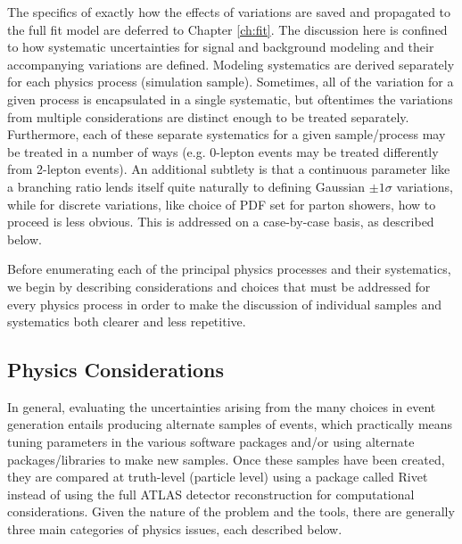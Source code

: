 The specifics of exactly how the effects of variations are saved and propagated to the full fit model are deferred to Chapter \ref{ch:fit}.  The discussion here is confined to how systematic uncertainties for signal and background modeling and their accompanying variations are defined.  
Modeling systematics are derived separately for each physics process (simulation sample).  Sometimes, all of the variation for a given process is encapsulated in a single systematic, but oftentimes the variations from multiple considerations are distinct enough to be treated separately.  Furthermore, each of these separate systematics for a given sample/process may be treated in a number of ways (e.g. 0-lepton events may be treated differently from 2-lepton events).  An additional subtlety is that a continuous parameter like a branching ratio lends itself quite naturally to defining Gaussian $\pm1\sigma$ variations, while for discrete variations, like choice of PDF set for parton showers, how to proceed is less obvious.  This is addressed on a case-by-case basis, as described below.

Before enumerating each of the principal physics processes and their systematics, we begin by describing considerations and choices that must be addressed for every physics process in order to make the discussion of individual samples and systematics both clearer and less repetitive.  %

\subsection{Physics Considerations}
In general, evaluating the uncertainties arising from the many choices in event generation entails producing alternate samples of events, which practically means tuning parameters in the various software packages and/or using alternate packages/libraries to make new samples.  Once these samples have been created, they are compared at truth-level (particle level) using a package called Rivet \cite{rivetmanual} instead of using the full ATLAS detector reconstruction for computational considerations.  Given the nature of the problem and the tools, there are generally three main categories of physics issues, each described below.

